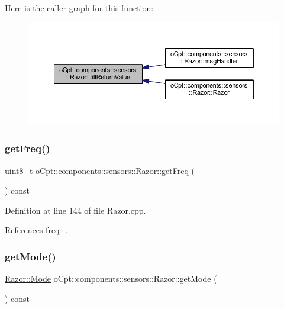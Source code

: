 Here is the caller graph for this function\+:\nopagebreak
\begin{figure}[H]
\begin{center}
\leavevmode
\includegraphics[width=350pt]{classo_cpt_1_1components_1_1sensors_1_1_razor_a1c058bfc9483cfcf94456d498bff380e_icgraph}
\end{center}
\end{figure}
\hypertarget{classo_cpt_1_1components_1_1sensors_1_1_razor_aefaf1327348e3e3b9717c40d7aa741c2}{}\label{classo_cpt_1_1components_1_1sensors_1_1_razor_aefaf1327348e3e3b9717c40d7aa741c2} 
\subsubsection{\texorpdfstring{get\+Freq()}{getFreq()}}
{\footnotesize\ttfamily uint8\+\_\+t o\+Cpt\+::components\+::sensors\+::\+Razor\+::get\+Freq (\begin{DoxyParamCaption}{ }\end{DoxyParamCaption}) const}



Definition at line 144 of file Razor.\+cpp.



References freq\+\_\+.

\hypertarget{classo_cpt_1_1components_1_1sensors_1_1_razor_ae9d8191555b521ee02cc26e387c900b1}{}\label{classo_cpt_1_1components_1_1sensors_1_1_razor_ae9d8191555b521ee02cc26e387c900b1} 
\subsubsection{\texorpdfstring{get\+Mode()}{getMode()}}
{\footnotesize\ttfamily \hyperlink{classo_cpt_1_1components_1_1sensors_1_1_razor_afed258e485aaaf9193a57d649ccb159b}{Razor\+::\+Mode} o\+Cpt\+::components\+::sensors\+::\+Razor\+::get\+Mode (\begin{DoxyParamCaption}{ }\end{DoxyParamCaption}) const}



